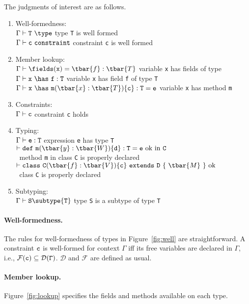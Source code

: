 The judgments of interest are as follows.
\begin{enumerate}
	\item Well-formedness:\\
	  $\wj{\Gamma}{\tt T}$ \hfill  type {\tt T} is well formed\\
	  ${\Gamma} \vdash {\tt c}~{\tt constraint}$ \hfill constraint {\tt c} is well formed
	\item Member lookup:\\
	  $\Gamma\vdash \fields({\tt x})=\tbar{f}:\tbar{T}$ \hfill variable {\tt x} has fields  of type \\
	  $\Gamma\vdash {\tt x}~\has~{\tt f}:{\tt T}$ \hfill variable {\tt x} has field {\tt f} of type {\tt T}\\
	  $\Gamma\vdash {\tt x}~\has~{\tt m}(\tbar{x}:\tbar{T})\{{\tt c}\}:{\tt T}={\tt e}$ \hfill variable {\tt x} has method {\tt m}
	\item Constraints:\\
	  $\Gamma\vdash {\tt c}$ \hfill constraint {\tt c} holds
	\item Typing:\\
	  $\Gamma\vdash {\tt e}:{\tt T}$ \hfill expression {\tt e} has type {\tt T}\\
	  $\vdash {\tt def}~{\tt m}(\tbar{y}:\tbar{W})\{{\tt d}\}:{\tt T}={\tt e}~{\rm ok~in}~{\tt C}$ \\ $~$ \hfill method {\tt m} in class {\tt C} is properly declared\\
	  $\vdash {\tt class}~{\tt C}(\tbar{f}:\tbar{V})\{{\tt c}\}~{\tt extends}~{\tt D}~\{~\tbar{M}~\}~{\rm ok}$ \\ $~$ \hfill class {\tt C} is properly declared
	\item Subtyping:\\
	  $\Gamma \vdash {\tt S} \subtype {\tt T}$ \hfill type {\tt S} is a subtype of type {\tt T}
\end{enumerate}

\paragraph{Well-formedness.} The rules for well-formedness of types in Figure~\ref{fig:well} are straightforward. A constraint $\tt c$ is well-formed for context $\Gamma$ iff its free variables are declared in $\Gamma$, i.e., $\tt\mathcal{F}(c)\subseteq\mathcal{D}(\Gamma)$. $\mathcal{D}$ and $\mathcal{F}$ are defined as usual.

\paragraph{Member lookup.} Figure~\ref{fig:lookup} specifies the fields and methods available on each type. %

